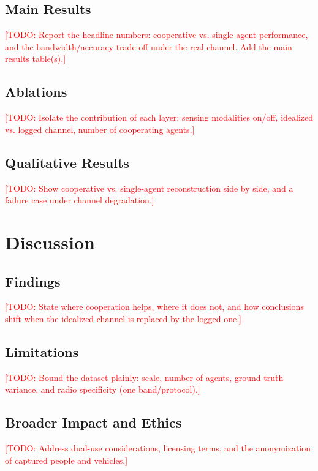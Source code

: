 \documentclass[conference]{IEEEtran}
\newcommand{\todo}[1]{\textcolor{red}{[TODO: #1]}}
\begin{document}
\subsection{Main Results}
\todo{Report the headline numbers: cooperative vs. single-agent
performance, and the bandwidth/accuracy trade-off under the real channel.
Add the main results table(s).}

\subsection{Ablations}
\todo{Isolate the contribution of each layer: sensing modalities on/off,
idealized vs. logged channel, number of cooperating agents.}

\subsection{Qualitative Results}
\todo{Show cooperative vs. single-agent reconstruction side by side, and a
failure case under channel degradation.}

\section{Discussion}
\label{sec:discussion}

\subsection{Findings}
\todo{State where cooperation helps, where it does not, and how conclusions
shift when the idealized channel is replaced by the logged one.}

\subsection{Limitations}
\todo{Bound the dataset plainly: scale, number of agents, ground-truth
variance, and radio specificity (one band/protocol).}

\subsection{Broader Impact and Ethics}
\todo{Address dual-use considerations, licensing terms, and the
anonymization of captured people and vehicles.}
\end{document}

